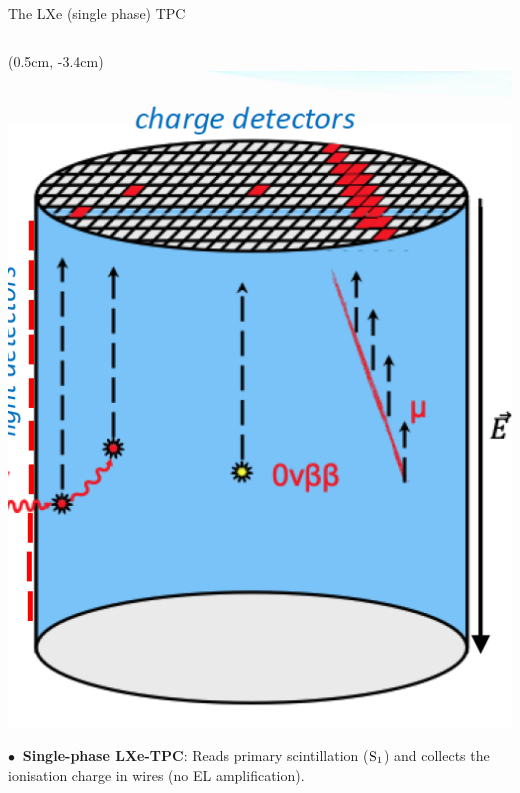 \documentclass [aspectratio=169]{beamer}
\newcommand{\so}{\ensuremath{\rm S_1}}
\begin{document}
\begin{frame}{The LXe (single phase) TPC}
\begin{columns}
 \begin{textblock*}{8cm}(0.5cm, -3.4cm)
 \includegraphics[scale=0.20]{nexobasis.png}
       
       $\bullet~$ {\bf Single-phase LXe-TPC}: Reads primary scintillation (\so) and collects the ionisation charge in wires (no EL amplification). 

    \end{textblock*}






\end{columns}
\end{frame}
\end{document}
